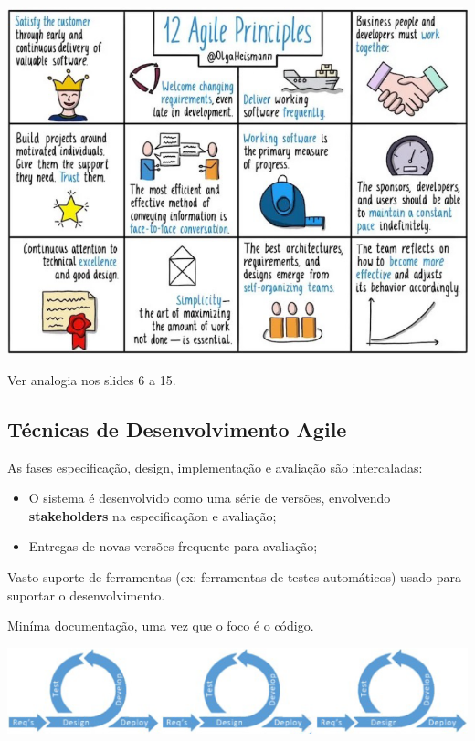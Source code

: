 \documentclass{article}
\begin{document}
\begin{center}
  \includegraphics[scale=0.5]{20}
\end{center}

Ver analogia nos slides 6 a 15.

\pagebreak

\subsection{Técnicas de Desenvolvimento Agile}

As fases especificação, design, implementação e avaliação são intercaladas:
\begin{itemize}
  \item O sistema é desenvolvido  como uma série de versões, envolvendo
  \textbf{stakeholders} na especificaçãon e avaliação;
  \item Entregas de novas versões frequente para avaliação;
\end{itemize}

Vasto suporte de ferramentas (ex: ferramentas de testes automáticos) usado
para suportar o desenvolvimento.

\vspace{2mm}

Miníma documentação, uma vez que o foco é o código.

\begin{center}
  \includegraphics[scale=0.5]{21}
\end{center}
\end{document}
